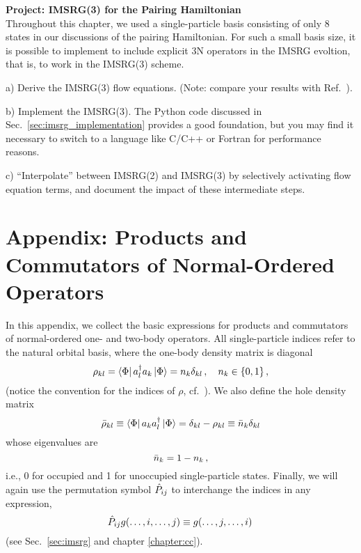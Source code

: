 {\begin{prob}
  \textbf{Project: IMSRG(3) for the Pairing Hamiltonian} \\
  Throughout this chapter, we used a single-particle basis consisting of only 
  8 states in our discussions of the pairing Hamiltonian. For such a small basis 
  size, it is possible to implement to include explicit 3N operators in the IMSRG
  evoltion, that is, to work in the IMSRG(3) scheme.

  \item[a)] Derive the IMSRG(3) flow equations. (Note: compare your results with
  Ref.~\cite{Hergert:2016jk}).

  \item[b)] Implement the IMSRG(3). The Python code discussed in Sec.~\ref{sec:imsrg_implementation}
  provides a good foundation, but you may find it necessary to switch to a 
  language like C/C++ or Fortran for performance reasons. 

  \item[c)] ``Interpolate'' between IMSRG(2) and IMSRG(3) by selectively activating
  flow equation terms, and document the impact of these intermediate steps.

\end{prob}

\section*{\label{app:products}Appendix: Products and Commutators of Normal-Ordered Operators}
In this appendix, we collect the basic expressions for products and commutators of
normal-ordered one- and two-body operators. All single-particle indices refer to 
the natural orbital basis, where the one-body density matrix is diagonal
\begin{equation}
  \rho_{kl} = \langle{\Phi}|\,{a^\dag_{l}a_{k}}\,|{\Phi}\rangle  = n_k \delta_{kl}\,,\quad n_k\in\{0,1\}\,,
\end{equation}
(notice the convention for the indices of $\rho$, cf.~\cite{Ring:1980bb}). We also
define the hole density matrix
\begin{equation}
  \bar\rho_{kl} \equiv \langle{\Phi}|\,{a_{k}a^\dag_{l}}\,|{\Phi}\rangle  = \delta_{kl} - \rho_{kl} \equiv \bar{n}_k\delta_{kl}
\end{equation}
whose eigenvalues are 
\begin{equation}
  \bar{n}_{k}  = 1 - n_{k}\,,
\end{equation}
i.e., 0 for occupied and 1 for unoccupied single-particle states. Finally, 
we will again use the permutation symbol $\hat{P}_{ij}$ to interchange the indices 
in any expression, 
\begin{equation}
  \hat{P}_{ij} g(\ldots,i,\ldots,j) \equiv g(\ldots,j,\ldots,i)\,
\end{equation}
(see Sec.~\ref{sec:imsrg} and chapter \ref{chapter:cc}).

}
